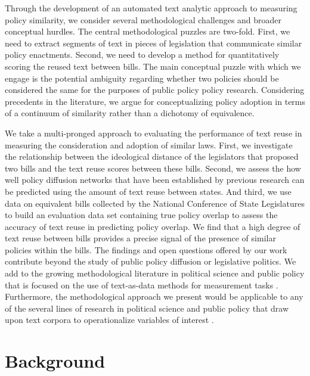 \documentclass[12pt]{article} %
\begin{document}
Through the development of an automated text analytic approach to measuring policy similarity, we consider several methodological challenges and broader conceptual hurdles. The central methodological puzzles are two-fold. First, we need to extract segments of text in pieces of legislation that communicate similar policy enactments. Second, we need to develop a method for quantitatively scoring the reused text between bills. The main conceptual puzzle with which we engage is the potential ambiguity regarding whether two policies should be considered the same for the purposes of public policy policy research. Considering precedents in the literature, we argue for conceptualizing policy adoption in terms of a continuum of similarity rather than a dichotomy of equivalence.

We take a multi-pronged approach to evaluating the performance of text reuse in measuring the consideration and adoption of similar laws. First, we investigate the relationship between the ideological distance of the legislators that proposed two bills and the text reuse scores between these bills. Second, we assess the how well policy diffusion networks that have been established by previous research can be predicted using the amount of text reuse between states. And third, we use data on equivalent bills collected by the National Conference of State Legislatures to build an evaluation data set containing true policy overlap to assess the accuracy of text reuse in predicting policy overlap. We find that a high degree of text reuse between bills provides a precise signal of the presence of similar policies within the bills. The findings and open questions offered by our work contribute beyond the study of public policy diffusion or legislative politics. We add to the growing methodological literature in political science and public policy that is focused on the use of text-as-data methods for measurement tasks \citep[see, e.g.,][]{laver2003extracting,martin2008robust,lowe2013validating,grimmer2013text,monroe2008fightin,blair2016national}. Furthermore, the methodological approach we present would be applicable to any of the several lines of research in political science and public policy that draw upon text corpora to operationalize variables of interest \citep[see, e.g.,][]{hart1990evolution,van2008parsing,young2012affective,mikhaylov2012coder,mondou2014policy,witting2015measuring}.


\section{Background}
\end{document}
